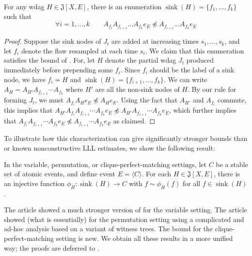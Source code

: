 \documentclass{toc}
\DeclareMathOperator{\sink}{sink}
\begin{document}
\begin{proposition}
\label{character-prop}
For any wdag $H \in \mathfrak J[X,E]$, there is an enumeration $\sink(H) = \{f_1, \dots, f_ k \}$ such that
\begin{equation}
\label{ord-eqn}
\forall i = 1, \dots, k \qquad A_{f_i} A_{f_{i+1}} \dots A_{f_k} e_E \not \preceq A_{f_{i+1}} \dots A_{f_k} e_E
\end{equation}
\end{proposition}
\begin{proof}
Suppose the sink nodes of $J_t$ are added at increasing times $s_1, \dots, s_k$, and let $f_i$ denote the flaw resampled at each time $s_i$. We claim that this enumeration satisfies the bound of .  For, let $H$ denote the partial wdag $J_t$ produced immediately before prepending some $f_i$. Since $f_i$ should be the label of a sink node, we have $f_i \not \sim H$ and $\sink(H) = \{f_{i+1}, \dots, f_k \}$. We can write $A_H = A_{H'} A_{f_{i+1}} \cdots A_{f_k}$ where $H'$ are all the non-sink nodes of $H$. By our rule for forming $J_t$, we must $A_{f_i} A_H e_E \not \preceq A_H e_E$. Using the fact that $A_{H'}$ and $A_{f_i}$ commute, this implies that $ A_{H'} A_{f_i} A_{f_{i+1}} \cdots A_{f_k} e_E  \not \preceq A_{H'} A_{f_{i+1}} \cdots A_{f_k} e_E$, which further implies that $A_{f_i} A_{f_{i+1}} \cdots A_{f_k} e_E  \not \preceq  A_{f_{i+1}} \cdots A_{f_k} e_E$ as claimed.
\end{proof}

To illustrate how this characterization can give significantly stronger bounds than  or known nonconstructive LLL estimates, we show the following result:
\begin{theorem}
\label{perm-thm}
In  the variable, permutation, or clique-perfect-matching settings, let $C$ be a stable set of atomic events, and define event $E  = \langle C \rangle$. For each $H \in \mathfrak J[X,E]$, there is an injective function $\phi_H: \sink(H) \rightarrow C$ with $f \sim \phi_H(f)$ for all $f \in \sink(H)$.
\end{theorem}


The %
article  %
\cite{LLLLBeyond} showed a much stronger version of  for the variable setting.  The %
article  %
\cite{NewBoundsHarris} showed (what is essentially)  for the permutation setting using a complicated and ad-hoc analysis based on a variant of witness trees. The bound for the clique-perfect-matching setting is new. We obtain all these results in a more unified way; the proofs are deferred to .
\end{document}
